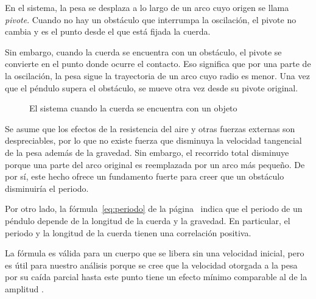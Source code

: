 \documentclass[letterpaper]{report}
\numberwithin{table}{section}
\begin{document}
En el sistema, la pesa se desplaza a lo largo de un arco cuyo origen
se llama \emph{pivote}. Cuando no hay un obstáculo que interrumpa la
oscilación, el pivote no cambia y es el punto desde el que está
fijada la cuerda.

Sin embargo, cuando la cuerda se encuentra con un obstáculo, el
pivote se convierte en el punto donde ocurre el contacto. Eso
significa que por una parte de la oscilación, la pesa sigue la
trayectoria de un arco cuyo radio es menor. Una vez que el péndulo
supera el obstáculo, se mueve otra vez desde su pivote original.

\begin{figure}[h]
  \centering
  \caption{El sistema cuando la cuerda se encuentra con un objeto}
\end{figure}

Se asume que los efectos de la resistencia del aire y otras fuerzas
externas son despreciables, por lo que no existe fuerza que disminuya
la velocidad tangencial de la pesa además de la gravedad. Sin
embargo, el recorrido total disminuye porque una parte del arco
original es reemplazada por un arco más pequeño. De por sí, este
hecho ofrece un fundamento fuerte para creer que un obstáculo
disminuiría el periodo.

Por otro lado, la fórmula~\eqref{eq:periodo} de la
página~\pageref{eq:periodo} indica que el periodo de un péndulo
depende de la longitud de la cuerda y la gravedad. En particular, el
periodo y la longitud de la cuerda tienen una correlación positiva.

La fórmula es válida para un cuerpo que se libera sin una velocidad
inicial, pero es útil para nuestro análisis porque se cree que la velocidad
otorgada a la pesa por su caída parcial hasta este punto tiene un
efecto mínimo comparable al de la amplitud \theta.
\end{document}
